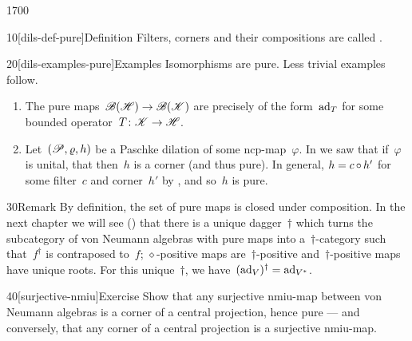 \begin{parsec}{1700}%
\begin{point}{10}[dils-def-pure]{Definition}%
    Filters, corners and their compositions are called .
\end{point}
\begin{point}{20}[dils-examples-pure]{Examples}%
Isomorphisms are pure.  Less trivial examples follow.
\begin{enumerate}
\item
The pure maps~$\mathscr{B}(\mathscr{H}) \to \mathscr{B}(\mathscr{K})$
    are precisely of the form~$\mathrm{ad}_T$
    for some bounded operator~$T\colon \mathscr{K} \to \mathscr{H}$.
\item
Let~$(\mathscr{P}, \varrho, h)$ be a Paschke dilation of some ncp-map~$\varphi$.
In  we saw that if~$\varphi$ is unital,
        that then~$h$ is a corner (and thus pure).
In general, $h = c \mathop{\circ} h'$ for some filter~$c$ and corner~$h'$
    by ,
        and so~$h$ is pure.
\end{enumerate}
\end{point}
\begin{point}{30}{Remark}%
By definition, the set of pure maps is closed under composition.
In the next chapter we will see () that
    there is a unique dagger~$\dagger$
    which turns the subcategory of von Neumann
    algebras with pure maps into a~$\dagger$-category
    such that~$f^\dagger$ is contraposed to~$f$;
            $\diamond$-positive maps are~$\dagger$-positive
            and~$\dagger$-positive maps have unique roots.
For this unique~$\dagger$, we have~$(\mathrm{ad}_V)^\dagger = \mathrm{ad}_{V^*}$.
\end{point}
\begin{point}{40}[surjective-nmiu]{Exercise}%
Show that any surjective nmiu-map between von Neumann algebras
        is a corner of a central projection, hence pure
        --- and conversely,
        that any corner of a central projection is a surjective nmiu-map.
\end{point}
\end{parsec}

